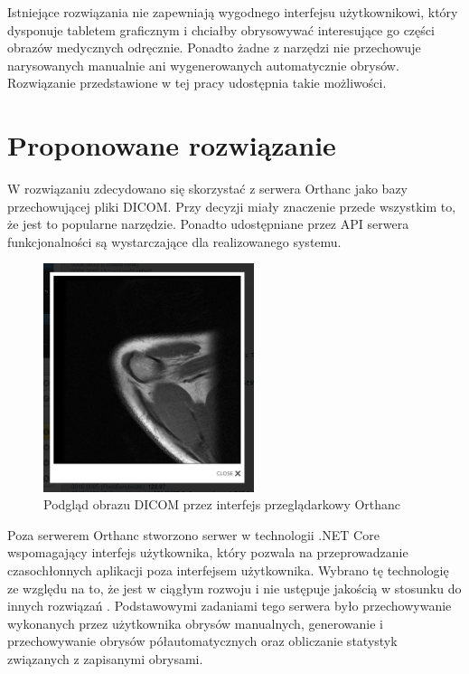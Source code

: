 \documentclass[a4paper,11pt,twoside,openright]{report}
\theoremstyle{definition}
\begin{document}
Istniejące rozwiązania nie zapewniają wygodnego interfejsu użytkownikowi, który dysponuje tabletem graficznym i chciałby obrysowywać interesujące go części obrazów medycznych odręcznie. Ponadto żadne z narzędzi nie przechowuje narysowanych manualnie ani wygenerowanych automatycznie obrysów.  Rozwiązanie przedstawione w tej pracy udostępnia takie możliwości.


\section {Proponowane rozwiązanie}

W rozwiązaniu zdecydowano się skorzystać z serwera Orthanc jako bazy przechowującej pliki DICOM. Przy decyzji miały znaczenie przede wszystkim to, że jest to popularne narzędzie. Ponadto udostępniane przez API serwera funkcjonalności są wystarczające dla realizowanego systemu.

\begin{figure}[b!]
	\center
	\includegraphics[width=0.55\textwidth]{Orthanc-preview}
	\caption{Podgląd obrazu DICOM przez interfejs przeglądarkowy Orthanc}
    	\label{fig:Orthanc-preview}
\end{figure}

Poza serwerem Orthanc stworzono serwer w technologii .NET Core \cite{Dotnet} wspomagający interfejs użytkownika, który pozwala na przeprowadzanie czasochłonnych aplikacji poza interfejsem użytkownika. Wybrano tę technologię ze względu na to, że jest w ciągłym rozwoju i nie ustępuje jakością w stosunku do innych rozwiązań \cite{Dlaczego dotnet}. Podstawowymi zadaniami tego serwera było przechowywanie wykonanych przez użytkownika obrysów manualnych, generowanie i przechowywanie obrysów półautomatycznych oraz obliczanie statystyk związanych z zapisanymi obrysami.
\end{document}
